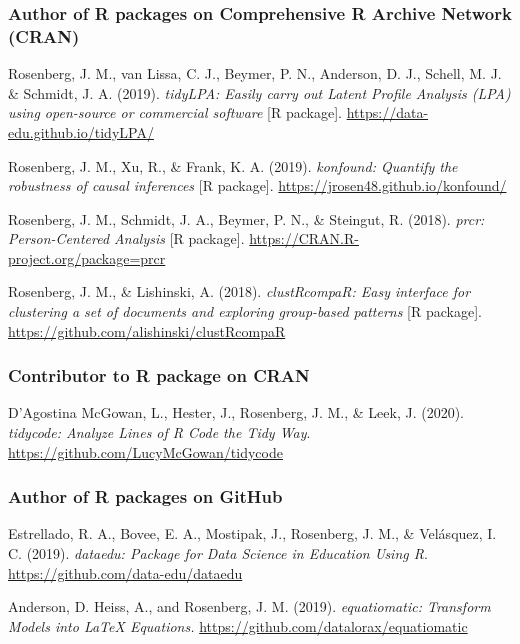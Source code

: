 \documentclass[
  14,
]{article}
\begin{document}
\hypertarget{author-of-r-packages-on-comprehensive-r-archive-network-cran}{%
\subsubsection{Author of R packages on Comprehensive R Archive Network
(CRAN)}\label{author-of-r-packages-on-comprehensive-r-archive-network-cran}}

Rosenberg, J. M., van Lissa, C. J., Beymer, P. N., Anderson, D. J.,
Schell, M. J. \& Schmidt, J. A. (2019). \emph{tidyLPA: Easily carry out
Latent Profile Analysis (LPA) using open-source or commercial software}
{[}R package{]}. \url{https://data-edu.github.io/tidyLPA/}

Rosenberg, J. M., Xu, R., \& Frank, K. A. (2019). \emph{konfound:
Quantify the robustness of causal inferences} {[}R package{]}.
\url{https://jrosen48.github.io/konfound/}

Rosenberg, J. M., Schmidt, J. A., Beymer, P. N., \& Steingut, R. (2018).
\emph{prcr: Person-Centered Analysis} {[}R package{]}.
\url{https://CRAN.R-project.org/package=prcr}

Rosenberg, J. M., \& Lishinski, A. (2018). \emph{clustRcompaR: Easy
interface for clustering a set of documents and exploring group-based
patterns} {[}R package{]}.
\url{https://github.com/alishinski/clustRcompaR}

\hypertarget{contributor-to-r-package-on-cran}{%
\subsubsection{Contributor to R package on
CRAN}\label{contributor-to-r-package-on-cran}}

D'Agostina McGowan, L., Hester, J., Rosenberg, J. M., \& Leek, J.
(2020). \emph{tidycode: Analyze Lines of R Code the Tidy Way}.
\url{https://github.com/LucyMcGowan/tidycode}

\hypertarget{author-of-r-packages-on-github}{%
\subsubsection{Author of R packages on
GitHub}\label{author-of-r-packages-on-github}}

Estrellado, R. A., Bovee, E. A., Mostipak, J., Rosenberg, J. M., \&
Velásquez, I. C. (2019). \emph{dataedu: Package for Data Science in
Education Using R}. \url{https://github.com/data-edu/dataedu}

Anderson, D. Heiss, A., and Rosenberg, J. M. (2019). \emph{equatiomatic:
Transform Models into LaTeX Equations.}
\url{https://github.com/datalorax/equatiomatic}
\end{document}

